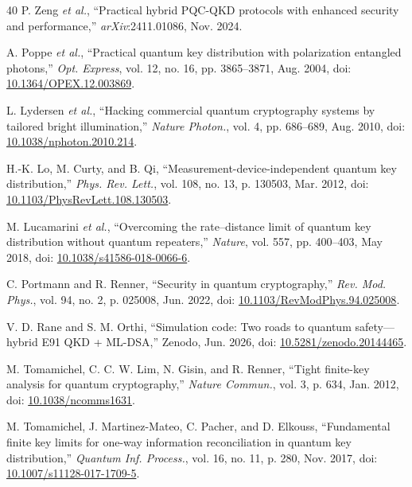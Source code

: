 \documentclass[conference]{IEEEtran}
\begin{document}
\begin{thebibliography}{40}
P. Zeng \emph{et al.}, ``Practical hybrid PQC-QKD protocols with enhanced security and performance,'' \emph{arXiv}:2411.01086, Nov. 2024.

A. Poppe \emph{et al.}, ``Practical quantum key distribution with polarization entangled photons,'' \emph{Opt. Express}, vol. 12, no. 16, pp. 3865--3871, Aug. 2004, doi: \href{https://doi.org/10.1364/OPEX.12.003869}{10.1364/OPEX.12.003869}.

L. Lydersen \emph{et al.}, ``Hacking commercial quantum cryptography systems by tailored bright illumination,'' \emph{Nature Photon.}, vol. 4, pp. 686--689, Aug. 2010, doi: \href{https://doi.org/10.1038/nphoton.2010.214}{10.1038/nphoton.2010.214}.

H.-K. Lo, M. Curty, and B. Qi, ``Measurement-device-independent quantum key distribution,'' \emph{Phys. Rev. Lett.}, vol. 108, no. 13, p. 130503, Mar. 2012, doi: \href{https://doi.org/10.1103/PhysRevLett.108.130503}{10.1103/PhysRevLett.108.130503}.

M. Lucamarini \emph{et al.}, ``Overcoming the rate--distance limit of quantum key distribution without quantum repeaters,'' \emph{Nature}, vol. 557, pp. 400--403, May 2018, doi: \href{https://doi.org/10.1038/s41586-018-0066-6}{10.1038/s41586-018-0066-6}.

C. Portmann and R. Renner, ``Security in quantum cryptography,'' \emph{Rev. Mod. Phys.}, vol. 94, no. 2, p. 025008, Jun. 2022, doi: \href{https://doi.org/10.1103/RevModPhys.94.025008}{10.1103/RevModPhys.94.025008}.

V. D. Rane and S. M. Orthi, ``Simulation code: Two roads to quantum safety---hybrid E91 QKD + ML-DSA,'' Zenodo, Jun. 2026, doi: \href{https://doi.org/10.5281/zenodo.20144465}{10.5281/zenodo.20144465}.

M. Tomamichel, C. C. W. Lim, N. Gisin, and R. Renner, ``Tight finite-key analysis for quantum cryptography,'' \emph{Nature Commun.}, vol. 3, p. 634, Jan. 2012, doi: \href{https://doi.org/10.1038/ncomms1631}{10.1038/ncomms1631}.

M. Tomamichel, J. Martinez-Mateo, C. Pacher, and D. Elkouss, ``Fundamental finite key limits for one-way information reconciliation in quantum key distribution,'' \emph{Quantum Inf. Process.}, vol. 16, no. 11, p. 280, Nov. 2017, doi: \href{https://doi.org/10.1007/s11128-017-1709-5}{10.1007/s11128-017-1709-5}.


\end{thebibliography}
\end{document}
